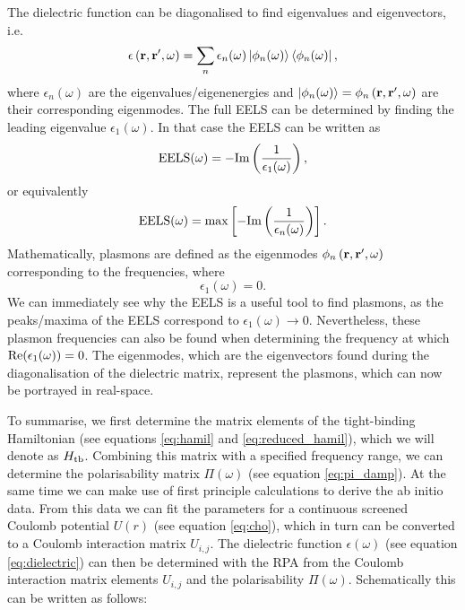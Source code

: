 The dielectric function can be diagonalised to find eigenvalues and eigenvectors, i.e. \cite{Westerhout2021}
\begin{equation}
    \epsilon\left(\mathbf{r},\mathbf{r}',\omega\right)=\sum_n\epsilon_n(\omega)\left|\phi_n(\omega)\right\rangle\left\langle\phi_n(\omega)\right|,
\end{equation}
where $\epsilon_n(\omega)$ are the eigenvalues/eigenenergies and $\left|\phi_n(\omega)\right\rangle = \phi_n\left(\mathbf{r},\mathbf{r}',\omega\right)$ are their corresponding eigenmodes. The full EELS can be determined by finding the leading eigenvalue $\epsilon_1(\omega)$. In that case the EELS can be written as
\begin{equation}\label{eq:eels}
    \mathrm{EELS}(\omega)=-\text{Im}\left(\frac{1}{\epsilon_1(\omega)}\right),
\end{equation}
or equivalently
\begin{equation}
    \mathrm{EELS}(\omega)=\max\left[-\text{Im}\left(\frac{1}{\epsilon_n(\omega)}\right)\right].
\end{equation}
Mathematically, plasmons are defined as the eigenmodes $\phi_n\left(\mathbf{r},\mathbf{r}',\omega\right)$ corresponding to the frequencies, where
\begin{equation}
    \epsilon_1(\omega) = 0.
\end{equation}
We can immediately see why the EELS is a useful tool to find plasmons, as the peaks/maxima of the EELS correspond to $\epsilon_1(\omega) \to 0$. Nevertheless, these plasmon frequencies can also be found when determining the frequency at which $\text{Re}(\epsilon_1(\omega))=0$. The eigenmodes, which are the eigenvectors found during the diagonalisation of the dielectric matrix, represent the plasmons, which can now be portrayed in real-space.\medskip

To summarise, we first determine the matrix elements of the tight-binding Hamiltonian (see equations \ref{eq:hamil} and \ref{eq:reduced_hamil}), which we will denote as $H_{\text{tb}}$. Combining this matrix with a specified frequency range, we can determine the polarisability matrix $\Pi(\omega)$ (see equation \ref{eq:pi_damp}). At the same time we can make use of first principle calculations to derive the ab initio data. From this data we can fit the parameters for a continuous screened Coulomb potential $U(r)$ (see equation \ref{eq:cho}), which in turn can be converted to a Coulomb interaction matrix $U_{i,j}$. The dielectric function $\epsilon(\omega)$ (see equation \ref{eq:dielectric}) can then be determined with the RPA from the Coulomb interaction matrix elements $U_{i,j}$ and the polarisability $\Pi(\omega)$. Schematically this can be written as follows:

